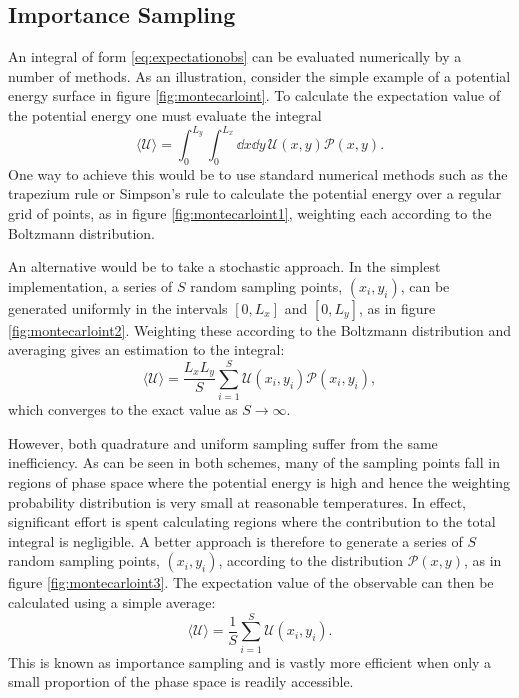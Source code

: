 \subsection{Importance Sampling}

An integral of form \eqref{eq:expectationobs} can be evaluated numerically by a number of methods.
As an illustration, consider the simple example of a \td{} potential energy surface in figure \ref{fig:montecarloint}.
To calculate the expectation value of the potential energy one must evaluate the integral
\begin{equation}
	\langle \mathcal{U} \rangle = \int_{0}^{L_y}\int_{0}^{L_x} \dd x \dd y\, \mathcal{U}\left(x,y\right)\mathcal{P}\left(x,y\right).
\end{equation}
One way to achieve this would be to use standard numerical methods such as the trapezium rule or Simpson's rule to calculate the potential energy over a regular grid of points, as in figure \ref{fig:montecarloint1}, weighting each according to the Boltzmann distribution.

An alternative would be to take a stochastic approach.
In the simplest implementation, a series of $S$ random sampling points, $\left(x_i,y_i\right)$, can be generated uniformly in the intervals $\left[0,L_x\right]$ and $\left[0,L_y\right]$, as in figure \ref{fig:montecarloint2}.
Weighting these according to the Boltzmann distribution and averaging gives an estimation to the integral:
\begin{equation}
	\langle \mathcal{U} \rangle = \frac{L_xL_y}{S}\sum_{i=1}^{S} \mathcal{U}\left(x_i,y_i\right)\mathcal{P}\left(x_i,y_i\right),
\end{equation}
which converges to the exact value as $S\rightarrow\infty$.

However, both quadrature and \mc{} uniform sampling suffer from the same inefficiency.
As can be seen in both schemes, many of the sampling points fall in regions of phase space where the potential energy is high and hence the weighting probability distribution is very small at reasonable temperatures.
In effect, significant effort is spent calculating regions where the contribution to the total integral is negligible.
A better approach is therefore to generate a series of $S$ random sampling points, $\left(x_i,y_i\right)$, according to the distribution $\mathcal{P}\left(x,y\right)$, as in figure \ref{fig:montecarloint3}.
The expectation value of the observable can then be calculated using a simple average:
\begin{equation}
	\langle \mathcal{U} \rangle = \frac{1}{S}\sum_{i=1}^{S} \mathcal{U}\left(x_i,y_i\right).
\end{equation}
This is known as importance sampling and is vastly more efficient when %
only a small proportion of the phase space is readily accessible.

